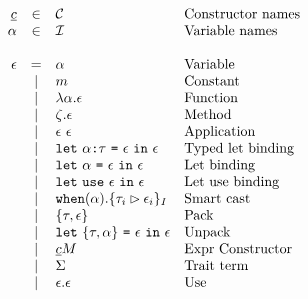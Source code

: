 \documentclass{article}[11pt]
\newcommand{\term}[1]{\verb~#1~}
\begin{document}
    \begin{math}
        \begin{array}{rclp{5cm}}
            \underline{c} & \in  & {\cal C}                                                                & Constructor names \\
            \alpha        & \in  & {\cal I}                                                                & Variable names    \\
            \\
            \epsilon & =
            & \alpha                                                                         & Variable              \\
            & \mid & m                                                                       & Constant              \\
            & \mid & \lambda \alpha . \epsilon                                               & Function              \\
            & \mid & \zeta . \epsilon                                                          & Method              \\
            & \mid & \epsilon ~ \epsilon                                                     & Application              \\
            & \mid & \term{let}~\alpha \term{:} \tau ~ \term{=} ~ \epsilon ~ \term{in} ~ \epsilon & Typed~let~binding             \\
            & \mid & \term{let}~\alpha ~ \term{=} ~ \epsilon ~ \term{in} ~ \epsilon          & Let~binding              \\
            & \mid & \term{let}~\term{use} ~ \epsilon ~\term{in}~\epsilon                    & Let~use~binding             \\
            & \mid & \term{when}(\alpha).\{ \tau_i \rhd \epsilon_i \}_I                      & Smart cast              \\
            & \mid & \{\tau, \epsilon\}                                                      & Pack              \\
            & \mid & \term{let} ~ \{\tau, \alpha\} ~ \term{=} ~ \epsilon ~\term{in}~\epsilon & Unpack               \\
            & \mid & \underline{c} M                                                         & Expr Constructor              \\
            & \mid & \Sigma                                                                  & Trait~term              \\
            & \mid & \epsilon . \epsilon                                                     & Use              \\
        \end{array} \\
    \end{math}
\end{document}
